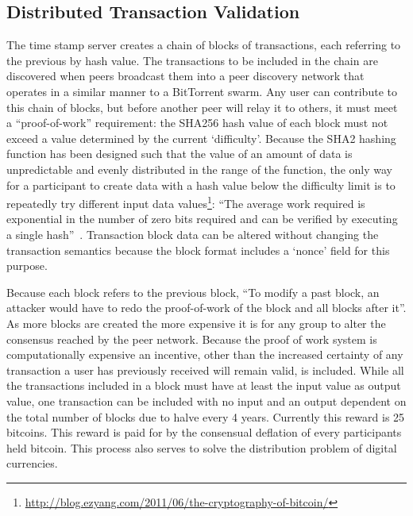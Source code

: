 \subsection{Distributed Transaction Validation}
The time stamp server creates a chain of blocks of transactions, each referring
to the previous by hash value.  The transactions to be included in the chain are
discovered when peers broadcast them into a peer discovery network that operates
in a similar manner to a BitTorrent swarm.  Any user can contribute to this
chain of blocks, but before another peer will relay it to others, it must meet a
``proof-of-work'' requirement: the SHA256 hash value of each block must not
exceed a value determined by the current `difficulty'.  Because the SHA2 hashing
function has been designed such that the value of an amount of data is
unpredictable and evenly distributed in the range of the function, the only way
for a participant to create data with a hash value below the difficulty limit is
to repeatedly try different input data
values\footnote{\url{http://blog.ezyang.com/2011/06/the-cryptography-of-bitcoin/}}: ``The average work required is exponential in the number
of zero bits required and can be verified by executing a single hash''~\cite{satoshi}.
Transaction block data can be altered without changing the transaction semantics
because the block format includes a `nonce' field for this purpose.

Because each block refers to the previous block, ``To modify a past block, an
attacker would have to redo the proof-of-work of the block and all blocks after
it''.  As more blocks are created the more expensive it is for any group to
alter the consensus reached by the peer network.  Because the proof of work
system is computationally expensive an incentive, other than the increased
certainty of any transaction a user has previously received will remain valid,
is included.  While all the transactions included in a block must have at least
the input value as output value, one transaction can be included with no input
and an output dependent on the total number of blocks due to halve every 4
years. Currently this reward is 25 bitcoins. This reward is paid for by the
consensual deflation of every participants held bitcoin. This process also
serves to solve the distribution problem of digital currencies.


